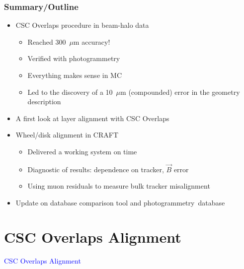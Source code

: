 \documentclass[compress]{beamer}
\begin{document}
\small

\begin{frame}
\frametitle{Summary/Outline}
\begin{itemize}\setlength{\itemsep}{0.25 cm}
\item CSC Overlaps procedure in beam-halo data
\begin{itemize}
\item Reached 300~$\mu$m accuracy!
\item Verified with photogrammetry
\item Everything makes sense in MC
\item Led to the discovery of a 10~$\mu$m (compounded) error in the geometry description
\end{itemize}

\item A first look at layer alignment with CSC Overlaps

\item Wheel/disk alignment in CRAFT
\begin{itemize}
\item Delivered a working system on time
\item Diagnostic of results: dependence on tracker, $\vec{B}$ error
\item Using muon residuals to measure bulk tracker misalignment
\end{itemize}

\item Update on database comparison tool and \mbox{photogrammetry database\hspace{-1 cm}}
\end{itemize}
\end{frame}

\section*{CSC Overlaps Alignment}
\begin{frame}
\begin{center}
\Huge \textcolor{blue}{CSC Overlaps Alignment}
\end{center}
\end{frame}
\end{document}
